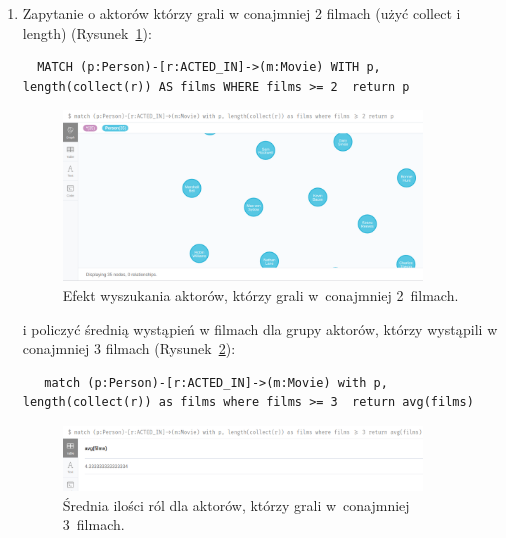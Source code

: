 \documentclass[a4paper,9pt]{extarticle}	%
\begin{document}
\begin{enumerate}
  \item Zapytanie o aktorów którzy grali w conajmniej 2 filmach (użyć collect i length) (Rysunek~\ref{scrn:5a}):
  \begin{lstlisting}
  MATCH (p:Person)-[r:ACTED_IN]->(m:Movie) WITH p, length(collect(r)) AS films WHERE films >= 2  return p
  \end{lstlisting}  
  \begin{figure}[ht]
    \centering
    \includegraphics[width=0.9\textwidth]{screeny/5a.png}
    \caption{Efekt wyszukania aktorów, którzy grali w~conajmniej 2~filmach.}
    \label{scrn:5a}
  \end{figure}
  
   i policzyć średnią wystąpień w filmach dla grupy aktorów, którzy wystąpili w conajmniej 3 filmach (Rysunek~\ref{scrn:5b}):
   \begin{lstlisting}
   match (p:Person)-[r:ACTED_IN]->(m:Movie) with p, length(collect(r)) as films where films >= 3  return avg(films)
   \end{lstlisting}
   \begin{figure}[ht]
    \centering
    \includegraphics[width=0.9\textwidth]{screeny/5b.png}
    \caption{Średnia ilości ról dla aktorów, którzy grali w~conajmniej 3~filmach.}
    \label{scrn:5b}
  \end{figure}
   

\end{enumerate}
\end{document}
